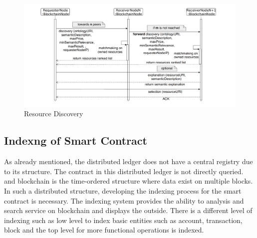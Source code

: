 \begin{center}
	\begin{figure}[htb!]
		
		\begin{minipage}{0.55\linewidth}
			\centering
			\includegraphics[width=1.95\textwidth]{images/chap01_SemanticBlockChain.png}
		\end{minipage}
		\caption[Resourse Discovery]{Resource Discovery\cite{Ruta}}
		
	\end{figure}
	
\end{center}

\subsection{Indexng of Smart Contract}
As already mentioned, the distributed ledger does not have a central registry due to its structure. The contract in this distributed ledger is not directly queried.
and blockchain is the time-ordered structure where data exist on multiple blocks.
In such a distributed structure, developing the indexing process for the smart contract is necessary. The indexing system provides the ability to analysis and search service on blockchain and displays the outside.
There is a different level of indexing such as low level to index basic entities such as account, transaction, block and the top level for more functional operations is indexed.

